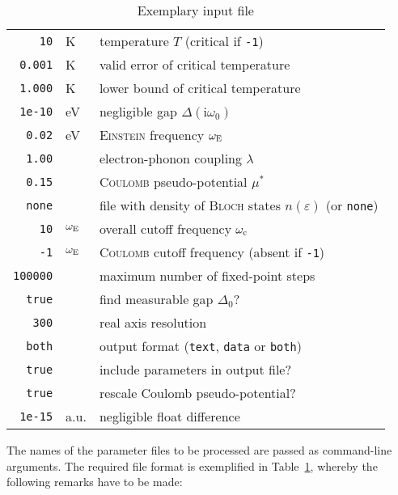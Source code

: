 \documentclass[twocolumn]{article}
\def\I{\mathrm i}
\def\sub#1{\sb{\mathrm{#1}}}
\let\epsilon\varepsilon
\let\Delta\varDelta
\newlength\gap
\let\name\textsc
\begin{document}
   \begin{table}
      \centering
      \begin{tabular}{r @{\,} *2l}
         \verb|10| & K & temperature $T$ (critical if \verb|-1|) \\
         [\gap]
         \verb|0.001| & K & valid error of critical temperature \\
         \verb|1.000| & K & lower bound of critical temperature \\
         \verb|1e-10| & eV & negligible gap $\Delta(\I \omega_0)$ \\
         [\gap]
         \verb|0.02| & eV & \name{Einstein} frequency $\omega \sub E$ \\
         \verb|1.00| && electron-phonon coupling $\lambda$ \\
         \verb|0.15| && \name{Coulomb} pseudo-potential $\mu^*$ \\
         [\gap]
         \verb|none| && file with density of \name{Bloch} states $n(\epsilon)$
            (or \verb|none|) \\
         [\gap]
         \verb|10| & $\omega \sub E$
            & overall cutoff frequency $\omega \sub c$\\
         \verb|-1| & $\omega \sub E$
            & \name{Coulomb} cutoff frequency (absent if \verb|-1|) \\
         [\gap]
         \verb|100000| && maximum number of fixed-point steps \\
         [\gap]
         \verb|true| && find measurable gap $\Delta_0$? \\
         \verb|300| && real axis resolution \\
         [\gap]
         \verb|both| && output format
            (\verb|text|, \verb|data| or \verb|both|) \\
         \verb|true| && include parameters in output file? \\
         [\gap]
         \verb|true| && rescale Coulomb pseudo-potential? \\
         [\gap]
         \verb|1e-15| & a.u. & negligible float difference
      \end{tabular}
      \caption{Exemplary input file}
      \label{input}
   \end{table}
   The names of  the parameter files to be processed  are passed as command-line
   arguments.  The required  file  format is  exemplified in  Table~\ref{input},
   whereby the following remarks have to be made:
\end{document}
